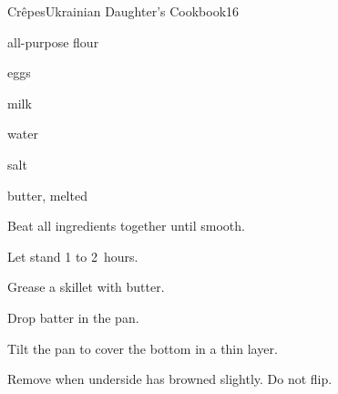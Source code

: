 \begin{recipe}{Crêpes}{Ukrainian Daughter's Cookbook}{16}

\begin{ingredients}
\item {} all-purpose flour
\item {} eggs
\item \C{\half} milk
\item \C{\half} water
\item \tp{\quarter} salt
\item {} butter, melted
\end{ingredients}

\begin{directions}
\item Beat all ingredients together until smooth.
\item Let stand 1 to 2~hours.
\item Grease a skillet with butter.
\item Drop  batter in the pan.
\item Tilt the pan to cover the bottom in a thin layer.
\item Remove when underside has browned slightly. Do not flip.
\end{directions}

\end{recipe}
